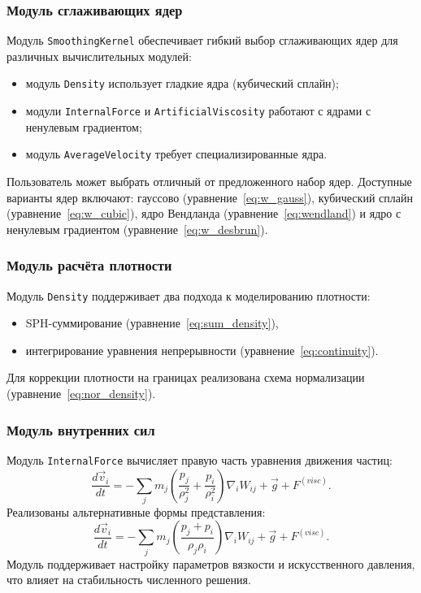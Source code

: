 \subsubsection{Модуль сглаживающих ядер}
Модуль \verb|SmoothingKernel| обеспечивает гибкий выбор сглаживающих ядер для различных вычислительных модулей:

\begin{itemize}
    \item модуль \verb|Density| использует гладкие ядра (кубический сплайн);
    \item модули \verb|InternalForce| и \verb|ArtificialViscosity| работают с ядрами с ненулевым градиентом;
    \item модуль \verb|AverageVelocity| требует специализированные ядра.
\end{itemize}

Пользователь может выбрать отличный от предложенного набор ядер.
%
Доступные варианты ядер включают: 
гауссово (уравнение~\ref{eq:w_gauss}), 
кубический сплайн (уравнение~\ref{eq:w_cubic}), 
ядро Вендланда (уравнение~\ref{eq:wendland}) 
и ядро с ненулевым градиентом (уравнение~\ref{eq:w_desbrun}). 

\subsubsection{Модуль расчёта плотности}
Модуль \verb|Density| поддерживает два подхода к моделированию плотности:
%
\begin{itemize}
    \item SPH-суммирование (уравнение~\ref{eq:sum_density}),
    \item интегрирование уравнения непрерывности (уравнение~\ref{eq:continuity}).
\end{itemize}
%
Для коррекции плотности на границах реализована схема нормализации (уравнение~\ref{eq:nor_density}).

\subsubsection{Модуль внутренних сил}
Модуль \verb|InternalForce| вычисляет правую часть уравнения движения частиц:
%
\begin{equation}
    \frac{d\vec{v}_{i}}{dt} = -\sum\limits_{j}m_{j}\left(
    \frac{p_{j}}{\rho_{j}^{2}} +
    \frac{p_{i}}{\rho_{i}^{2}}
    \right) \nabla_{i} W_{ij} + \vec{g} + F^{(visc)}.
\end{equation}
%
Реализованы альтернативные формы представления:
\begin{equation}
    \frac{d\vec{v}_{i}}{dt} = -\sum\limits_{j}m_{j}\left(
    \frac{p_{j} + p_{i}}{\rho_{j}\rho_{i}}
    \right) \nabla_{i} W_{ij} + \vec{g} + F^{(visc)}.
\end{equation}
%
Модуль поддерживает настройку параметров вязкости и искусственного давления, что влияет на стабильность численного решения.


